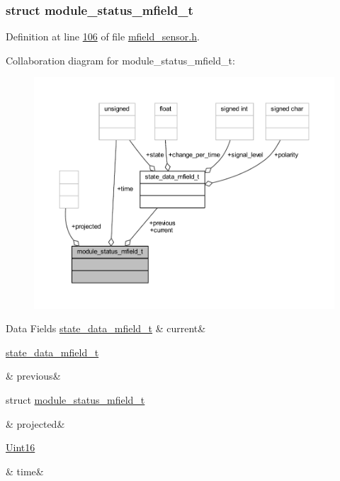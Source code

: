 \subsubsection{struct module\+\_\+status\+\_\+mfield\+\_\+t}


Definition at line \hyperlink{a00019_source_l00106}{106} of file \hyperlink{a00019_source}{mfield\+\_\+sensor.\+h}.



Collaboration diagram for module\+\_\+status\+\_\+mfield\+\_\+t\+:\nopagebreak
\begin{figure}[H]
\begin{center}
\leavevmode
\includegraphics[width=350pt]{d5/da3/a00953}
\end{center}
\end{figure}
\begin{DoxyFields}{Data Fields}
\hypertarget{a00019_acf41ffc11da291c2f9f0fcb02ee72b98}{\hyperlink{a00019_df/d0c/a00788}{state\+\_\+data\+\_\+mfield\+\_\+t}}\label{a00019_acf41ffc11da291c2f9f0fcb02ee72b98}
&
current&
\\
\hline

\hypertarget{a00019_adcb859b2f3983a9c58deab28e59c333f}{\hyperlink{a00019_df/d0c/a00788}{state\+\_\+data\+\_\+mfield\+\_\+t}}\label{a00019_adcb859b2f3983a9c58deab28e59c333f}
&
previous&
\\
\hline

\hypertarget{a00019_af2267fb093fb5dcaa006a570a6da3b6b}{struct \hyperlink{a00019_d5/d0a/a00602}{module\+\_\+status\+\_\+mfield\+\_\+t}}\label{a00019_af2267fb093fb5dcaa006a570a6da3b6b}
&
projected&
\\
\hline

\hypertarget{a00019_ad496f33595a12b00015d6778e594321c}{\hyperlink{a00072_a59a9f6be4562c327cbfb4f7e8e18f08b}{Uint16}}\label{a00019_ad496f33595a12b00015d6778e594321c}
&
time&
\\
\hline

\end{DoxyFields}
\label{d9/dc1/a00388}
\hypertarget{a00019_d9/dc1/a00388}{}
